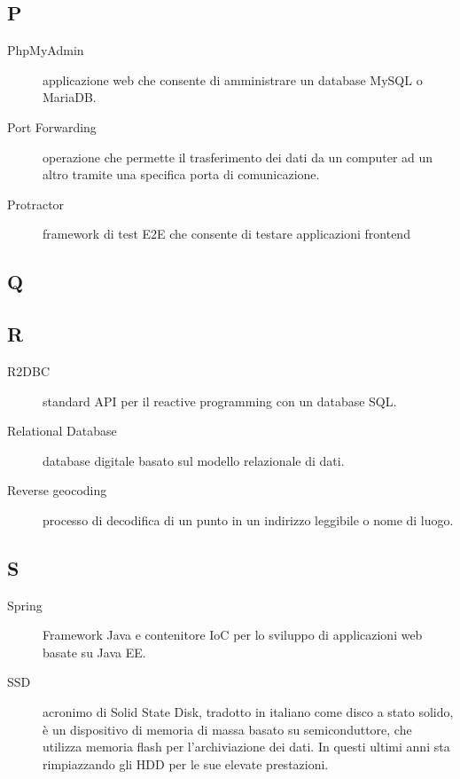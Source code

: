 \documentclass[../../../manuale.sviluppatore.tex]{subfiles}
\begin{document}
\subsection{P}

\begin{description}
    \item[PhpMyAdmin] applicazione web che consente di amministrare un database MySQL o MariaDB\@.
    \item[Port Forwarding] operazione che permette il trasferimento dei dati da un computer ad un altro tramite una specifica porta di comunicazione.
    \item[Protractor] framework di test E2E che consente di testare applicazioni frontend
\end{description}

\subsection{Q}

\subsection{R}

\begin{description}
    \item[R2DBC] standard API per il reactive programming con un database SQL\@.
    \item[Relational Database] database digitale basato sul modello relazionale di dati.
    \item[Reverse geocoding] processo di decodifica di un punto in un indirizzo leggibile o nome di luogo.
\end{description}

\subsection{S}

\begin{description}
    \item[Spring] Framework Java e contenitore IoC per lo sviluppo di applicazioni web basate su Java EE\@.
    \item[SSD] acronimo di Solid State Disk, tradotto in italiano come disco a stato solido, è un dispositivo di memoria di massa basato su semiconduttore, che utilizza memoria flash per l'archiviazione dei dati. In questi ultimi anni sta rimpiazzando gli HDD per le sue elevate prestazioni.
\end{description}
\end{document}
